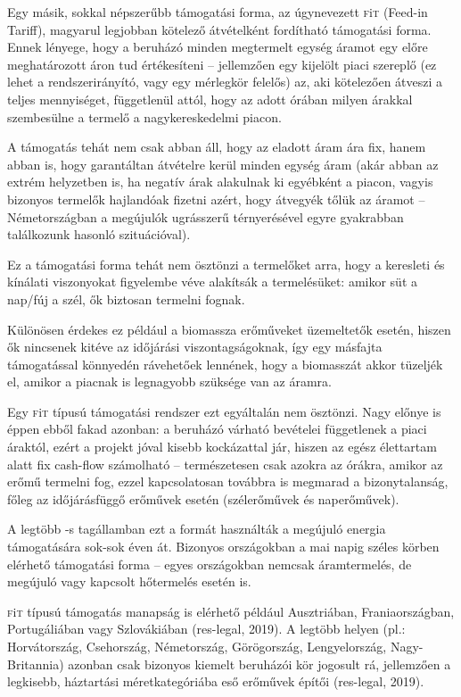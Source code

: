 \documentclass[twoside, magyar, showtrims]{corvinusphd}
\newcommand{\fit}{\textsc{f}i\textsc{t}\index{\textsc{f}i\textsc{t}} }
\begin{document}
Egy másik, sokkal népszerűbb támogatási forma,
az úgynevezett \fit (Feed-in Tariff), 
magyarul legjobban kötelező átvételként
fordítható támogatási forma.
Ennek lényege, hogy a beruházó minden
megtermelt egység áramot 
egy előre meghatározott áron tud értékesíteni
-- jellemzően egy kijelölt piaci szereplő
(ez lehet a rendszerirányító, vagy egy mérlegkör felelős)
az, aki kötelezően átveszi a teljes mennyiséget,
függetlenül attól, hogy az adott órában milyen
árakkal szembesülne a termelő a nagykereskedelmi piacon.

A támogatás tehát nem csak abban áll,
hogy az eladott áram ára fix, hanem abban
is, hogy garantáltan átvételre kerül minden
egység áram (akár abban az extrém helyzetben is,
ha negatív árak alakulnak ki egyébként a piacon,
vagyis bizonyos termelők hajlandóak
fizetni azért, hogy átvegyék tőlük az áramot
-- Németországban a megújulók
ugrásszerű térnyerésével egyre gyakrabban
találkozunk hasonló szituációval).

Ez a támogatási forma tehát nem ösztönzi
a termelőket arra, hogy a keresleti és kínálati
viszonyokat figyelembe véve alakítsák a termelésüket:
amikor süt a nap/fúj a szél, ők biztosan termelni fognak.

Különösen érdekes ez például a biomassza erőműveket üzemeltetők
esetén, hiszen ők nincsenek kitéve
az időjárási viszontagságoknak, így egy másfajta
támogatással könnyedén rávehetőek lennének,
hogy a biomasszát akkor tüzeljék el,
amikor a piacnak is legnagyobb szüksége van az áramra.

Egy \fit típusú támogatási rendszer ezt egyáltalán nem ösztönzi.
Nagy előnye is éppen ebből fakad azonban:
a beruházó várható bevételei függetlenek
a piaci áraktól, ezért a projekt jóval kisebb
kockázattal jár, hiszen az egész élettartam
alatt fix cash-flow számolható -- természetesen
csak azokra az órákra, amikor az erőmű termelni fog,
ezzel kapcsolatosan továbbra is megmarad a bizonytalanság,
főleg az időjárásfüggő erőművek esetén
(szélerőművek és naperőművek).

A legtöbb -s tagállamban ezt 
a formát használták a megújuló energia
támogatására sok-sok éven át.
Bizonyos országokban a mai napig széles
körben elérhető támogatási forma
 -- egyes országokban nemcsak áramtermelés,
de megújuló vagy kapcsolt hőtermelés esetén is.

\fit típusú támogatás manapság is elérhető például
Ausztriában, Franiaországban, Portugáliában vagy Szlovákiában
(res-legal, 2019). A legtöbb helyen (pl.: Horvátország,
Csehország, Németország, Görögország,
Lengyelország, Nagy-Britannia)
azonban csak bizonyos kiemelt beruházói kör jogosult rá,
jellemzően a legkisebb,
háztartási méretkategóriába eső erőművek építői (res-legal, 2019).
\end{document}
